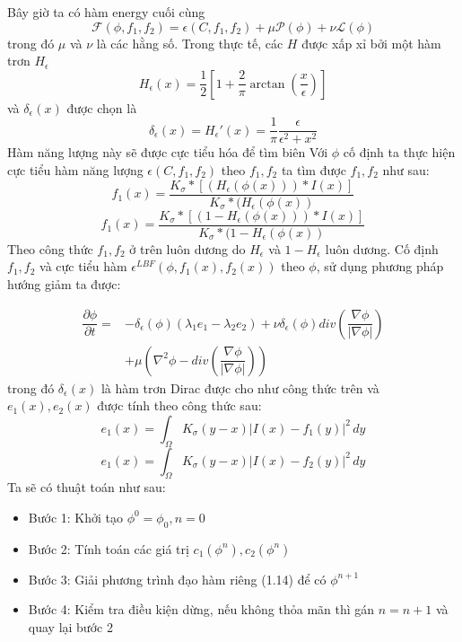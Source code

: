 \documentclass[12pt, oneside, a4]{book}
\begin{document}
Bây giờ ta có hàm energy cuối cùng
\begin{equation*}
\mathcal{F}(\phi,f_1,f_2)=\epsilon(C, f_1, f_2)+\mu \mathcal{P}(\phi)+\nu \mathcal{L}(\phi)
\end{equation*}
trong đó $\mu$ và $\nu$ là các hằng số. Trong thực tế, các $H$ được xấp xỉ bởi một hàm trơn $H_{\epsilon}$
\begin{equation*}
H_{\epsilon}(x)=\dfrac{1}{2}[1+\dfrac{2}{\pi}\arctan(\dfrac{x}{\epsilon})]
\end{equation*}
và $\delta_{\epsilon}(x)$ được chọn là
\begin{equation*}
\delta_{\epsilon}(x)=H_{\epsilon}'(x)=\dfrac{1}{\pi}\dfrac{\epsilon}{\epsilon^2+x^2}
\end{equation*}
Hàm năng lượng này sẽ được cực tiểu hóa để tìm biên 
Với $\phi$ cố định ta thực hiện cực tiểu hàm năng lượng $\epsilon(C, f_1, f_2)$  theo $f_1, f_2$ ta tìm được $f_1, f_2$ như sau:
\begin{equation}
f_1(x)=\dfrac{K_{\sigma}*[(H_{\epsilon}(\phi(x)))*I(x)]}{K_{\sigma}*(H_{\epsilon}(\phi(x))}
\end{equation}
\begin{equation}
f_1(x)=\dfrac{K_{\sigma}*[(1-H_{\epsilon}(\phi(x)))*I(x)]}{K_{\sigma}*(1-H_{\epsilon}(\phi(x))}
\end{equation}
Theo công thức $f_1, f_2$ ở trên luôn dương do $H_{\epsilon}$ và $1-H_{\epsilon}$ luôn dương. Cố định $f_1, f_2$ và cực tiểu hàm $\epsilon^{LBF}(\phi, f_1(x), f_2(x))$ theo $\phi$, sử dụng phương pháp hướng giảm ta được:

\begin{equation*}
\begin{split}
\dfrac{\partial \phi}{\partial t}=&- \delta_{\epsilon}(\phi)(\lambda_1 e_1 -\lambda_2 e_2)+\nu \delta_{\epsilon}(\phi)div(\dfrac{\nabla \phi}{|\nabla \phi|})\\
&+\mu(\nabla^2 \phi -div(\dfrac{\nabla \phi}{|\nabla \phi|}))
\end{split}
\end{equation*} 
trong đó $\delta_{\epsilon}(x)$ là hàm trơn Dirac được cho như công thức trên và $e_1(x), e_2(x)$ được tính theo công thức sau:
\begin{equation*}
e_1(x)=\int_{\Omega}K_{\sigma}(y-x)|I(x)-f_1(y)|^2 \,dy
\end{equation*}
\begin{equation*}
e_1(x)=\int_{\Omega}K_{\sigma}(y-x)|I(x)-f_2(y)|^2 \,dy
\end{equation*}
Ta sẽ có thuật toán như sau:
\begin{itemize}
\item Bước 1: Khởi tạo $\phi^0=\phi_0, n=0$
\item Bước 2: Tính toán các giá trị $c_1(\phi^n), c_2(\phi^n)$
\item Bước 3: Giải phương trình đạo hàm riêng (1.14) để có $\phi^{n+1}$
\item Bước 4: Kiểm tra điều kiện dừng, nếu không thỏa mãn thì gán $n=n+1$ và quay lại bước 2
\end{itemize}
\end{document}
